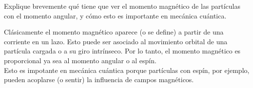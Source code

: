 \question [20] Explique brevemente qué tiene que ver el momento magnético de las partículas con el momento angular, y cómo esto es importante en mecánica cuántica.

\begin{solution}

Clásicamente el momento magnético aparece (o se define) a partir de una corriente en un lazo. Esto puede ser asociado al movimiento orbital de una partícula cargada o a su giro intrínseco. Por lo tanto, el momento magnético es proporcional ya sea al momento angular o al espín.\\

Esto es impotante en mecánica cuántica porque partículas con espín, por ejemplo, pueden acoplarse (o sentir) la influencia de campos magnéticos. 

\end{solution}

\vspace{1.0cm}